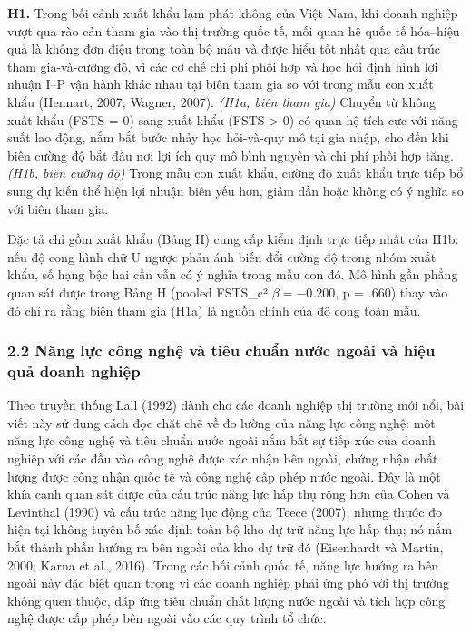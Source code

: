 \documentclass[12pt,a4paper]{article}
\begin{document}
\textbf{H1.} Trong bối cảnh xuất khẩu lạm phát không của Việt Nam, khi
doanh nghiệp vượt qua rào cản tham gia vào thị trường quốc tế, mối quan
hệ quốc tế hóa--hiệu quả là không đơn điệu trong toàn bộ mẫu và được
hiểu tốt nhất qua cấu trúc tham gia-và-cường độ, vì các cơ chế chi phí
phối hợp và học hỏi định hình lợi nhuận I--P vận hành khác nhau tại biên
tham gia so với trong mẫu con xuất khẩu (Hennart, 2007; Wagner, 2007).
\emph{(H1a, biên tham gia)} Chuyển từ không xuất khẩu (FSTS = 0) sang
xuất khẩu (FSTS \textgreater{} 0) có quan hệ tích cực với năng suất lao
động, nắm bắt bước nhảy học hỏi-và-quy mô tại gia nhập, cho đến khi biên
cường độ bắt đầu nơi lợi ích quy mô bình nguyên và chi phí phối hợp
tăng. \emph{(H1b, biên cường độ)} Trong mẫu con xuất khẩu, cường độ xuất
khẩu trực tiếp bổ sung dự kiến thể hiện lợi nhuận biên yếu hơn, giảm dần
hoặc không có ý nghĩa so với biên tham gia.

Đặc tả chỉ gồm xuất khẩu (Bảng H) cung cấp kiểm định trực tiếp nhất của
H1b: nếu độ cong hình chữ U ngược phản ánh biến đổi cường độ trong nhóm
xuất khẩu, số hạng bậc hai cần vẫn có ý nghĩa trong mẫu con đó. Mô hình
gần phẳng quan sát được trong Bảng H (pooled FSTS\_c²
\(\beta = −0.200\), p = .660) thay vào đó chỉ ra rằng biên tham gia
(H1a) là nguồn chính của độ cong toàn mẫu.

\hypertarget{22-nux103ng-lux1ef1c-cuxf4ng-nghux1ec7-vuxe0-tiuxeau-chuux1ea9n-nux1b0ux1edbc-ngouxe0i-vuxe0-hiux1ec7u-quux1ea3-doanh-nghiux1ec7p}{%
\subsubsection{2.2 Năng lực công nghệ và tiêu chuẩn nước ngoài và hiệu
quả doanh
nghiệp}\label{22-nux103ng-lux1ef1c-cuxf4ng-nghux1ec7-vuxe0-tiuxeau-chuux1ea9n-nux1b0ux1edbc-ngouxe0i-vuxe0-hiux1ec7u-quux1ea3-doanh-nghiux1ec7p}}

Theo truyền thống Lall (1992) dành cho các doanh nghiệp thị trường mới
nổi, bài viết này sử dụng cách đọc chặt chẽ về đo lường của năng lực
công nghệ: một năng lực công nghệ và tiêu chuẩn nước ngoài nắm bắt sự
tiếp xúc của doanh nghiệp với các đầu vào công nghệ được xác nhận bên
ngoài, chứng nhận chất lượng được công nhận quốc tế và công nghệ cấp
phép nước ngoài. Đây là một khía cạnh quan sát được của cấu trúc năng
lực hấp thụ rộng hơn của Cohen và Levinthal (1990) và cấu trúc năng lực
động của Teece (2007), nhưng thước đo hiện tại không tuyên bố xác định
toàn bộ kho dự trữ năng lực hấp thụ; nó nắm bắt thành phần hướng ra bên
ngoài của kho dự trữ đó (Eisenhardt và Martin, 2000; Karna et al.,
2016). Trong các bối cảnh quốc tế, năng lực hướng ra bên ngoài này đặc
biệt quan trọng vì các doanh nghiệp phải ứng phó với thị trường không
quen thuộc, đáp ứng tiêu chuẩn chất lượng nước ngoài và tích hợp công
nghệ được cấp phép bên ngoài vào các quy trình tổ chức.
\end{document}
